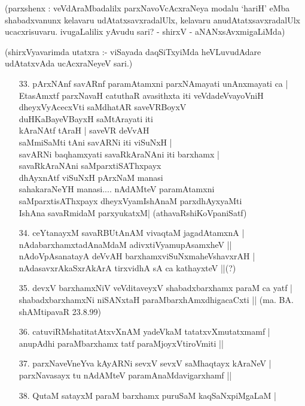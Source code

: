 (parxshenx : veVdAraMbadalilx parxNavoVcAcxraNeya modalu `hariH' eMba shabadxvanunx kelavaru udAtatxsavxradalUlx, kelavaru anudAtatxsavxradalUlx ucacxrisuvaru. ivugaLalilix yAvudu sari? - shirxV - aNANxsAvxmigaLiMda)

(shirxVyavarimda utatxra :- viSayada daqSiTxyiMda heVLuvudAdare udAtatxvAda ucAcxraNeyeV sari.)

\begin{itemize}
\item[33.] pArxNAnf savARnf paramAtamxni parxNAmayati unAnxmayati ca |\\
EtasAmxtf parxNavaH catuthaR avasithxta iti veVdadeVvayoVniH \\
dheyxVyAcecxVti saMdhatAR saveVRBoyxV \\
duHKaBayeVBayxH saMtArayati iti \\
kAraNAtf tAraH | saveVR deVvAH \\
saMmiSaMti tAni savARNi iti viSuNxH |\\
savARNi baqhamxyati savaRkAraNAni iti barxhamx |\\
savaRkAraNAni saMparxtiSAThxpayx \\
dhAyxnAtf viSuNxH pArxNaM manasi \\
sahakaraNeYH manasi.... nAdAMteV paramAtamxni\\
saMparxtisAThxpayx dheyxVyamIshAnaM parxdhAyxyaMti\\
IshAna savaRmidaM parxyukatxM|
\hfill{(athavaRshiKoVpaniSatf)}
\item[34.] ceYtanayxM savaRBUtAnAM vivaqtaM jagadAtamxnA |\\
nAdabarxhamxtadAnaMdaM adivxtiVyamupAsamxheV ||\\
nAdoVpAsanatayA deVvAH barxhamxviSuNxmaheVshavxrAH |\\
nAdasavxrAkaSxrAkArA tirxvidhA sA ca kathayxteV ||\quad(?)
\item[35.] devxV barxhamxNiV veVditaveyxV shabadxbarxhamx paraM ca yatf |\\
shabadxbarxhamxNi niSANxtaH paraMbarxhAmxdhigacaCxti ||
\hfill{(ma. BA. shAMtipavaR 23.8.99)}
\item[36.] catuviRMshatitatAtxvXnAM yadeVkaM tatatxvXmutatxmamf |\\
anupAdhi paraMbarxhamx tatf paraMjoyxVtiroVmiti ||
\item[37.] parxNaveVneYva kAyARNi sevxV sevxV saMhaqtayx kAraNeV |\\
parxNavasayx tu nAdAMteV paramAnaMdavigarxhamf ||
\item[38.] QutaM satayxM paraM barxhamx puruSaM kaqSaNxpiMgaLaM |\\

\end{itemize}
